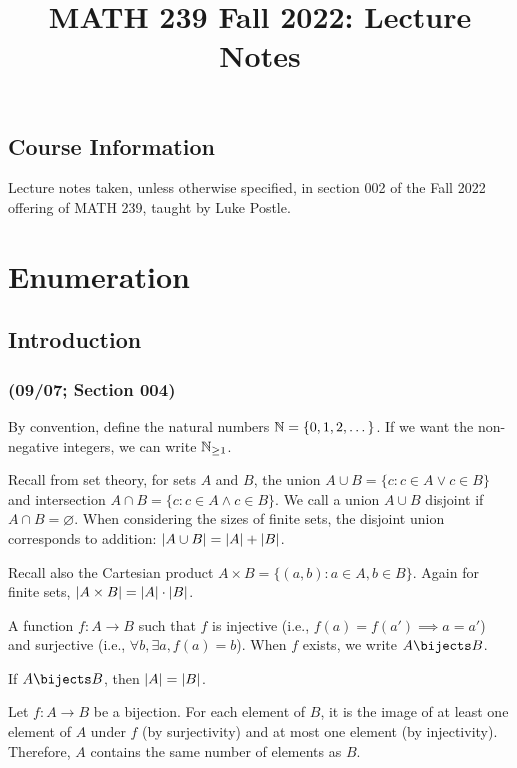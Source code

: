 \documentclass[class=math239,notes]{agony}
\title{MATH 239 Fall 2022: Lecture Notes}
\begin{document}
\thispagestyle{firstpage}
\tableofcontents

\pagebreak

\chapter*{Course Information}

Lecture notes taken, unless otherwise specified,
in section 002 of the Fall 2022 offering of MATH 239,
taught by Luke Postle.

\part{Enumeration}

\chapter{Introduction}

\section{(09/07; Section 004)}

By convention, define the natural numbers $\mathbb{N} = \{0,1,2,\dotsc\}$.
If we want the non-negative integers, we can write $\mathbb{N}_{\geq1}$.

Recall from set theory, for sets $A$ and $B$,
the union $A \cup B = \{c : c \in A \lor c \in B\}$
and intersection $A \cap B = \{c : c \in A \land c \in B\}$.
We call a union $A \cup B$ disjoint if $A \cap B = \varnothing$.
When considering the sizes of finite sets,
the disjoint union corresponds to addition:
$\abs{A \cup B} = \abs{A} + \abs{B}$.

Recall also the Cartesian product $A \times B = \{(a,b) : a \in A, b \in B\}$.
Again for finite sets, $\abs{A \times B} = \abs{A} \cdot \abs{B}$.

\begin{defn}[bijection]
  A function $f : A \to B$ such that $f$ is injective (i.e., $f(a) = f(a') \implies a = a'$)
  and surjective (i.e., $\forall b, \exists a, f(a) = b$).
  When $f$ exists, we write $A \bijects B$.
\end{defn}

\begin{theorem}
  If $A \bijects B$, then $\abs{A} = \abs{B}$.
\end{theorem}
\begin{prf}
  Let $f : A \to B$ be a bijection.
  For each element of $B$, it is the image of
  at least one element of $A$ under $f$ (by surjectivity)
  and at most one element (by injectivity).
  Therefore, $A$ contains the same number of elements as $B$.
\end{prf}
\end{document}
